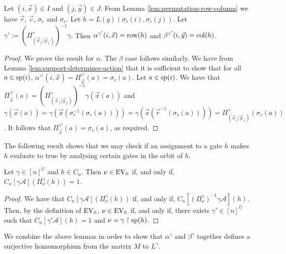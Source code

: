 \documentclass[../paper.tex]{subfiles}
\begin{document}
\begin{lem}
  \label{lem:defining-h-from-IJ}
  Let $(i, \vec{x}) \in I$ and $(j, \vec{y}) \in J$. From Lemma
  \ref{lem:permutation-row-column} we have $\vec{r}$, $\vec{c}$, $\sigma_r$ and
  $\sigma_c$. Let $h = L(g) (\sigma_r (i), \sigma_c (j))$. Let $\gamma' :=
  (\Pi^{\gamma}_{(\vec{x}_{\vec{r}} \vert \vec{y}_{\vec{c}})})^{-1} \gamma$.
  Then $\alpha^{\gamma'} (i, \vec{x}) = \text{row} (h)$ and $\beta^{\gamma'}
  (i,\vec{y}) = \text{col}(h)$.
\end{lem}
\begin{proof}
  We prove the result for $\alpha$. The $\beta$ case follows similarly. We have
  from Lemma \ref{lem:support-determines-action} that it is sufficient to show
  that for all $a \in \text{sp}(i)$, $\alpha^{\gamma'}(i, \vec{x}) =
  \Pi^{\gamma'}_{\vec{x}} (a) = \sigma_r (a)$. Let $a \in \text{sp}(i)$. We have
  that $\Pi^{\gamma'}_{\vec{x}} (a) = (\Pi^{\gamma}_{(\vec{x}_{\vec{r}} \vert
    \vec{y}_{\vec{c}})})^{-1} \gamma (\vec{x} (a))$ and $\gamma (\vec{x}(a)) =
  \gamma (\vec{x} (\sigma^{-1}_r(\sigma_r(a)))) = \gamma (\vec{x} (\vec{r}^{-1}
  (\sigma_r(a)))) = \Pi^{\gamma}_{(\vec{x}_{\vec{r}} \vert
    \vec{y}_{\vec{c}})}(\sigma_r(a))$. It follows that
  $\Pi^{\gamma'}_{\vec{x}}(a) = \sigma_r(a)$, as required.
\end{proof}

The following result shows that we may check if an assignment to a gate $h$
makes $h$ evaluate to true by analysing certain gates in the orbit of $h$.

\begin{lem}
  Let $\gamma\in [n]^{\underline{U}}$ and $h \in C_n$. Then $\nu \in \text{EV}_h$ if,
  and only if, $C_n[\gamma \mathcal{A}](\Pi^{\gamma}_\nu (h)) = 1$.
  \label{lem:translate-EV-circuits}
\end{lem}
\begin{proof}
  We have that $C_n[\gamma \mathcal{A}](\Pi^{\gamma}_\nu(h))$ if, and only if,
  $C_n[(\Pi^{\gamma}_{\nu})^{-1}\gamma \mathcal{A}] (h)$. Then, by the
  definition of $\text{EV}_h$, $\nu \in \text{EV}_h$ if, and only if, there exists $\gamma'
  \in [n]^{\underline{U}}$ such that $C_n[\gamma' \mathcal{A}](h) = 1$ and $\nu
  = \gamma\restriction{\text{sp}(h)}$.
\end{proof}

We combine the above lemmas in order to show that $\alpha^{\gamma}$ and
$\beta^{\gamma}$ together defines a surjective homomorphism from the matrix $M$
to $L^{\gamma}$.
\end{document}
